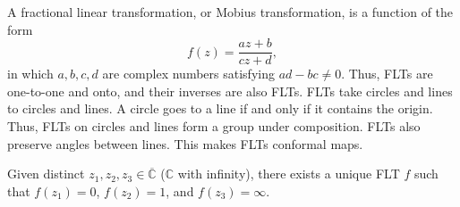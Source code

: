 \documentclass{article}
\begin{document}
    A fractional linear transformation, or Mobius transformation, is a function of the form $$f(z) = \frac{az+b}{cz+d},$$ in which $a,b,c,d$ are complex numbers satisfying $ad-bc \neq 0$.
    Thus, FLTs are one-to-one and onto, and their inverses are also FLTs.
    FLTs take circles and lines to circles and lines. A circle goes to a line if and only if it contains the origin.
    Thus, FLTs on circles and lines form a group under composition.
    FLTs also preserve angles between lines. This makes FLTs conformal maps.

\medskip
{}

    Given distinct $z_1, z_2, z_3 \in \overline{\mathbb C}$ ($\mathbb C$ with infinity), there exists a unique FLT $f$ such that $f(z_1) = 0$, $f(z_2) = 1$, and $f(z_3) = \infty$.
\end{document}
